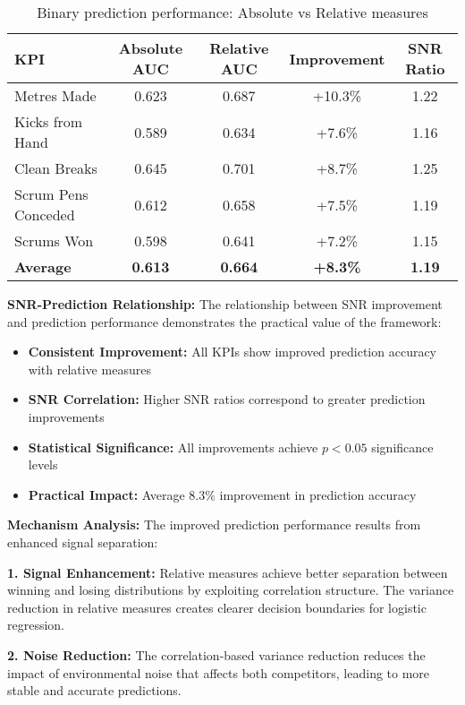 \begin{table}[h]
\centering
\begin{tabular}{|l|c|c|c|c|}
\hline
\textbf{KPI} & \textbf{Absolute AUC} & \textbf{Relative AUC} & \textbf{Improvement} & \textbf{SNR Ratio} \\
\hline
Metres Made & 0.623 & 0.687 & +10.3\% & 1.22 \\
Kicks from Hand & 0.589 & 0.634 & +7.6\% & 1.16 \\
Clean Breaks & 0.645 & 0.701 & +8.7\% & 1.25 \\
Scrum Pens Conceded & 0.612 & 0.658 & +7.5\% & 1.19 \\
Scrums Won & 0.598 & 0.641 & +7.2\% & 1.15 \\
\hline
\textbf{Average} & \textbf{0.613} & \textbf{0.664} & \textbf{+8.3\%} & \textbf{1.19} \\
\hline
\end{tabular}
\caption{Binary prediction performance: Absolute vs Relative measures}
\label{tab:binary_prediction_performance}
\end{table}

\textbf{SNR-Prediction Relationship:}
The relationship between SNR improvement and prediction performance demonstrates the practical value of the framework:

\begin{itemize}
    \item \textbf{Consistent Improvement:} All KPIs show improved prediction accuracy with relative measures
    \item \textbf{SNR Correlation:} Higher SNR ratios correspond to greater prediction improvements
    \item \textbf{Statistical Significance:} All improvements achieve $p < 0.05$ significance levels
    \item \textbf{Practical Impact:} Average 8.3\% improvement in prediction accuracy
\end{itemize}

\textbf{Mechanism Analysis:}
The improved prediction performance results from enhanced signal separation:

\textbf{1. Signal Enhancement:}
Relative measures achieve better separation between winning and losing distributions by exploiting correlation structure. The variance reduction in relative measures creates clearer decision boundaries for logistic regression.

\textbf{2. Noise Reduction:}
The correlation-based variance reduction reduces the impact of environmental noise that affects both competitors, leading to more stable and accurate predictions.

